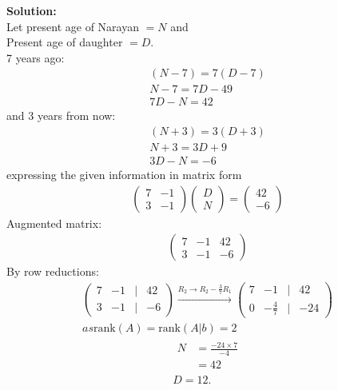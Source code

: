 \documentclass[journal]{IEEEtran}
\begin{document}
\textbf{Solution:}\\
Let present age of Narayan $= N$ and \\
Present age of daughter $= D$. \\
7 years ago: 
\begin{align}
(N-7) = 7(D-7) \\
N-7 = 7D -49 \\
7D-N = 42
\end{align}
and 3 years from now: 
\begin{align}
(N+3) = 3(D+3) \\
N+3 = 3D +9\\
3D-N = -6 
\end{align}
expressing the given information in matrix form
\begin{align}
\begin{pmatrix}7 & -1 \\3 & -1\end{pmatrix}\begin{pmatrix}D \\N\end{pmatrix}=\begin{pmatrix}42 \\-6\end{pmatrix}
\end{align}
Augmented matrix:
\begin{align}
\left(\begin{array}{cc|c}7 & -1 & 42 \\3 & -1 & -6\end{array}\right)
\end{align}
By row reductions:\\
\begin{align}
\begin{pmatrix}7 & -1 & | & 42 \\3 & -1 & | & -6\end{pmatrix}\xrightarrow{R_2 \rightarrow R_2 - \frac{3}{7} R_1}\begin{pmatrix}7 & -1 & | & 42 \\0 & -\frac{4}{7} & | & -24\end{pmatrix}\\
as \text{rank}(A) = \text{rank}(A|b) = 2
\end{align}
\begin{align}
\begin{aligned}N &= \frac{-24 \times 7}{-4} \\&= 42\end{aligned}\\
D = 12.
\end{align}
\end{document}
